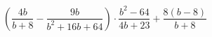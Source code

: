\begin{ex}[type=expression]
	\begin{condition}
		\(\left( \dfrac{4b}{b+8}-\dfrac{9b}{b^2+16b+64} \right)\cdot\dfrac{b^2-64}{4b+23}+\dfrac{8(b-8)}{b+8}\)
	\end{condition}
\end{ex}